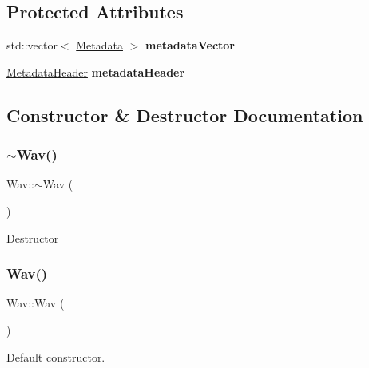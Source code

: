 \subsection*{Protected Attributes}
\begin{DoxyCompactItemize}
\item 
\mbox{\label{classWav_a4495ea0de605957484c946bde5cd73e3}} 
std\+::vector$<$ \hyperlink{structMetadata}{Metadata} $>$ {\bfseries metadata\+Vector}
\item 
\mbox{\label{classWav_a56b98b402771736ce14157fe593023fe}} 
\hyperlink{structMetadataHeader}{Metadata\+Header} {\bfseries metadata\+Header}
\end{DoxyCompactItemize}


\subsection{Constructor \& Destructor Documentation}
\mbox{\label{classWav_a1510b246ba121b103a60b8e7839af25f}} 
\subsubsection{\texorpdfstring{$\sim$\+Wav()}{~Wav()}}
{\footnotesize\ttfamily Wav\+::$\sim$\+Wav (\begin{DoxyParamCaption}{ }\end{DoxyParamCaption})\hspace{0.3cm}{\ttfamily [virtual]}}

Destructor \mbox{\label{classWav_abe9848ac7af353c82a78f00a600c18e6}} 
\subsubsection{\texorpdfstring{Wav()}{Wav()}\hspace{0.1cm}{\footnotesize\ttfamily [1/2]}}
{\footnotesize\ttfamily Wav\+::\+Wav (\begin{DoxyParamCaption}{ }\end{DoxyParamCaption})}

Default constructor. \mbox{\label{classWav_a8c11f0c7e8573a4c9180e5690ab2a354}} 
